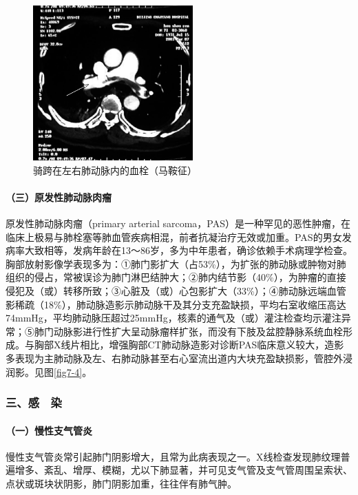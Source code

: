 \begin{figure}[!htbp]
 \centering
 \includegraphics[width=2.41667in,height=2.34375in]{./images/Image00054.jpg}
 \captionsetup{justification=centering}
 \caption{骑跨在左右肺动脉内的血栓（马鞍征）}
 \label{fig7-3}
  \end{figure} 

\paragraph{（三）原发性肺动脉肉瘤}

原发性肺动脉肉瘤（primary arterial
sarcoma，PAS）是一种罕见的恶性肿瘤，在临床上极易与肺栓塞等肺血管疾病相混，前者抗凝治疗无效或加重。PAS的男女发病率大致相等，发病年龄在13～86岁，多为中年患者，确诊依赖手术病理学检查。胸部放射影像学表现多为：①肺门影扩大（占53\%），为扩张的肺动脉或肿物对肺组织的侵占，常被误诊为肺门淋巴结肿大；②肺内结节影（40\%），为肿瘤的直接侵犯及（或）转移所致；③心脏及（或）心包影扩大（33\%）；④肺动脉远端血管影稀疏（18\%），肺动脉造影示肺动脉干及其分支充盈缺损，平均右室收缩压高达74mmHg，平均肺动脉压超过25mmHg，核素的通气及（或）灌注检查均示灌注异常；⑤肺门动脉影进行性扩大呈动脉瘤样扩张，而没有下肢及盆腔静脉系统血栓形成。与胸部X线片相比，增强胸部CT肺动脉造影对诊断PAS临床意义较大，造影多表现为主肺动脉及左、右肺动脉甚至右心室流出道内大块充盈缺损影，管腔外浸润影。见图\ref{fig7-4}。

\subsubsection{三、感　染}

\paragraph{（一）慢性支气管炎}

慢性支气管炎常引起肺门阴影增大，且常为此病表现之一。X线检查发现肺纹理普遍增多、紊乱、增厚、模糊，尤以下肺显著，并可见支气管及支气管周围呈索状、点状或斑块状阴影，肺门阴影加重，往往伴有肺气肿。


